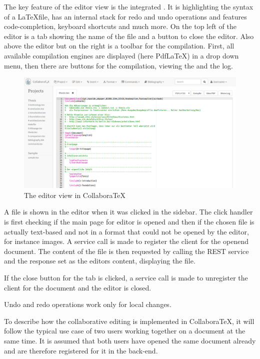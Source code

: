 
The key feature of the editor view is the integrated . It is highlighting the syntax of a \LaTeX file, has an internal stack for redo and undo operations and features code-completion, keyboard shortcuts and much more. On the top left of the editor is a tab showing the name of the file and a button to close the editor. Also above the editor but on the right is a toolbar for the compilation. First, all available compilation engines are displayed (here PdfLaTeX) in a drop down menu, then there are buttons for the compilation, viewing the  and the log.

\begin{figure}[H]
	\centering
		\includegraphics[width=\textwidth]{images/screenshot-editor.png}
	\caption{The editor view in CollaboraTeX}
\end{figure}

\pagebreak

A file is shown in the editor when it was clicked in the sidebar. The click handler is first checking if the main page for editor is opened and then if the chosen file is actually text-based and not in a format that could not be opened by the editor, for instance images. A service call is made to register the client for the openend document. The content of the file is then requested by calling the REST service and the response set as the editors content, displaying the file.

If the close button for the tab is clicked, a service call is made to unregister the client for the document and the editor is closed.

Undo and redo operations work only for local changes.


To describe how the collaborative editing is implemented in CollaboraTeX, it will follow the typical use case of two users working together on a document at the same time. It is assumed that both users have opened the same document already and are therefore registered for it in the back-end.

